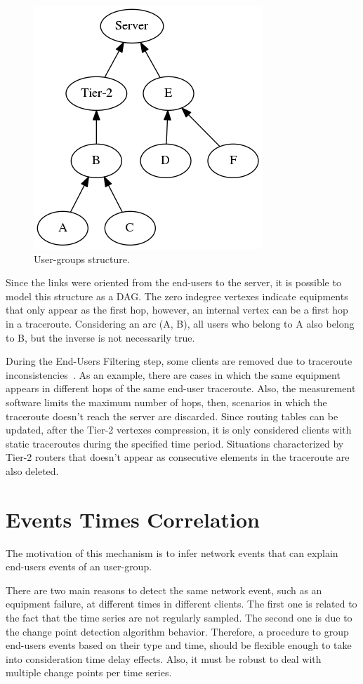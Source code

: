 \begin{figure}[H]
    \centering
    \includegraphics[width=0.35\linewidth]{./figures/methodology/spatial_correlation/dtstart2016-05-01_dtend2016-05-11_NRIDTCLDM031_graph_anonymized.png}
    \caption{User-groups structure.}
\label{fig:real_graph}
\end{figure}%

Since the links were oriented from the end-users to the server,
it is possible to model this structure as a DAG\@. The zero
indegree vertexes indicate equipments that only appear as the first hop,
however, an internal vertex can be a first hop in a traceroute.
Considering an arc (A, B), all users who belong to A also belong to B,
but the inverse is not necessarily true.

During the End-Users Filtering step, some clients are removed due to traceroute
inconsistencies~\cite{avoiding_traceroute_anomalies_with_paris_traceroute}.
As an example, there are cases in which the same equipment appears in different
hops of the same end-user traceroute. Also,
the measurement software limits the maximum number of hops, then,
scenarios in which the traceroute doesn't reach the server are discarded.
Since routing tables can be updated, after the Tier-2 vertexes compression,
it is only considered clients with static traceroutes
during the specified time period.
Situations characterized by Tier-2 routers that doesn't appear as consecutive
elements in the traceroute are also deleted.

\section{Events Times Correlation}
\label{sec:events_times_correlation}

The motivation of this mechanism is to infer network events that can explain
end-users events of an user-group.

There are two main reasons to detect the same network event, such as an
equipment failure, at different times in different clients. The first one is
related to the fact that the time series are not regularly sampled. The second
one is due to the change point detection algorithm behavior.
Therefore, a procedure to group end-users events based on their type and time,
should be flexible enough to take into consideration time delay effects. Also,
it must be robust to deal with multiple change points per time series.

